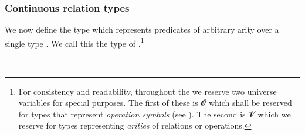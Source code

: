 \subsubsection{Continuous relation types}\label{continuous-relation-types}

We now define the type  which represents predicates of arbitrary arity over a single type . We call this the type of .\footnote{%
For consistency and readability, throughout the \ualib we reserve two universe variables for special purposes. The first of these is 𝓞 which shall be reserved for types that represent \emph{operation symbols} (see ). The second is 𝓥 which we reserve for types representing \emph{arities} of relations or operations.}
\ccpad
\begin{code}%
\>[0]\AgdaSpace{}%
\AgdaSymbol{:}\AgdaSpace{}%
\AgdaSpace{}%
\AgdaSpace{}%
\AgdaSpace{}%
\AgdaSpace{}%
\AgdaSpace{}%
\AgdaSpace{}%
\AgdaSymbol{(}\AgdaSpace{}%
\AgdaSymbol{:}\AgdaSpace{}%
\AgdaSymbol{)}\AgdaSpace{}%
\AgdaSpace{}%
\AgdaSpace{}%
\AgdaSpace{}%
\AgdaSpace{}%
\AgdaSpace{}%
\AgdaSpace{}%
\AgdaSpace{}%
\<%
\\
\>[0]\AgdaSpace{}%
\AgdaSpace{}%
\AgdaSpace{}%
\AgdaSpace{}%
\AgdaSymbol{=}\AgdaSpace{}%
\AgdaSymbol{(}\AgdaSpace{}%
\AgdaSpace{}%
\AgdaSymbol{)}\AgdaSpace{}%
\AgdaSpace{}%
\AgdaSpace{}%
\<%
\end{code}

